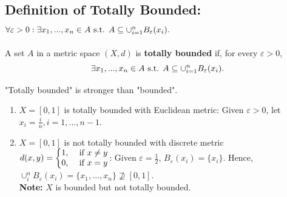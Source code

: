 \documentclass[11pt]{elegantbook}
\begin{document}
\subsection{Definition of Totally Bounded: $\forall \varepsilon>0: \exists x_1,...,x_n\in A \textnormal{ s.t. }A\subseteq \cup_{i=1}^n B_{\varepsilon}(x_i).$}
\begin{definition}
    \normalfont
    A set $A$ in a metric space $(X, d)$ is \textbf{totally bounded} if, for every $\varepsilon > 0$, $$\exists x_1,...,x_n\in A \textnormal{ s.t. }A\subseteq \cup_{i=1}^n B_{\varepsilon}(x_i).$$
\end{definition}
\begin{claim}
    "Totally bounded" is stronger than "bounded".
\end{claim}
\begin{example}
    \begin{enumerate}
        \item $X=[0,1]$ is totally bounded with Euclidean metric: Given $\varepsilon>0$, let $x_i=\frac{i}{n}, i=1,...,n-1$.
        \item $X=[0,1]$ is not totally bounded with discrete metric $d(x,y)=\left\{\begin{matrix}
            1,& \textnormal{ if }x\neq y\\
            0,& \textnormal{ if }x=y
        \end{matrix}\right.$: Given $\varepsilon=\frac{1}{2}$, $B_\varepsilon(x_i)=\{x_i\}$. Hence, $\cup_i^n B_{\varepsilon}(x_i)=\{x_1,...,x_n\}\nsupseteq[0,1]$.\\
        \textbf{Note:} $X$ is bounded but not totally bounded.
    \end{enumerate}
\end{example}
\end{document}
